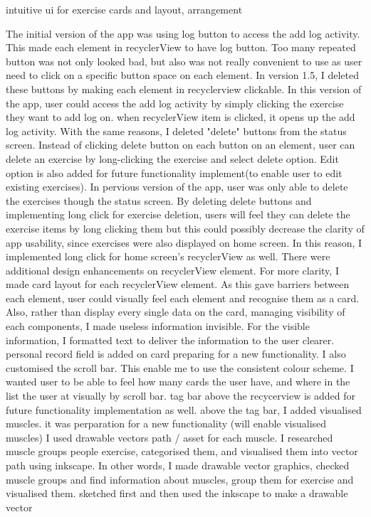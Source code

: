 

intuitive ui for exercise cards and layout, arrangement





The initial version of the app was using log button to access the add log activity.
This made each element in recyclerView to have log button.
Too many repeated button was not only looked bad, but also was not really convenient to use as user need to click on a specific button space on each element.
In version 1.5, I deleted these buttons by making each element in recyclerview clickable. 
In this version of the app, user could access the add log activity by simply clicking the exercise they want to add log on.
when recyclerView item is clicked, it opens up the add log activity.
With the same reasons, I deleted "delete" buttons from the status screen.
Instead of clicking delete button on each button on an element, user can delete an exercise by long-clicking the exercise and select delete option.
Edit option is also added for future functionality implement(to enable user to edit existing exercises).  
In pervious version of the app, user was only able to delete the exercises though the status screen.
By deleting delete buttons and implementing long click for exercise deletion, users will feel they can delete the exercise items by long clicking them
but this could possibly decrease the clarity of app usability, since exercises were also displayed on home screen.
In this reason, I implemented long click for home screen's recyclerView as well. 
There were additional design enhancements on recyclerView element. 
For more clarity, I made card layout for each recyclerView element.
As this gave barriers between each element, user could visually feel each element and recognise them as a card.
Also, rather than display every single data on the card, managing visibility of each components, I made useless information invisible.
For the visible information, I formatted text to deliver the information to the user clearer.
personal record field is added on card  preparing for a new functionality.
I also customised the scroll bar.
This enable me to use the consistent colour scheme.
I wanted user to be able to feel how many cards the user have, and where in the list the user at visually by scroll bar.
tag bar above the recycerview is added for future functionality implementation as well.
above the tag bar, I added visualised muscles. it was perparation for a new functionality (will enable visualised muscles)
I used drawable vectors path / asset for each muscle.
I researched muscle groups people exercise, categorised them, and visualised them into vector path using inkscape.
In other words, I made drawable vector graphics, checked muscle groups and find information about muscles, group them for exercise and visualised them. 
sketched first and then used the inkscape to make a drawable vector

